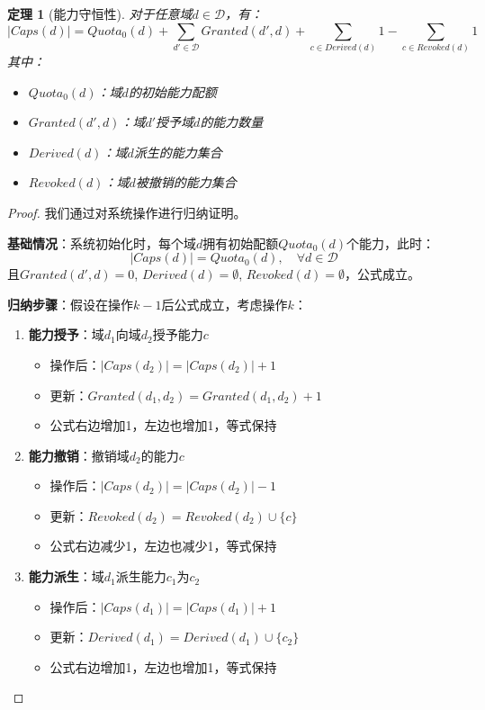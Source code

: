 \documentclass{article}
\newtheorem{theorem}{定理}[section]
\theoremstyle{definition}
\theoremstyle{remark}
\begin{document}
\begin{theorem}[能力守恒性]
    对于任意域$d \in \mathcal{D}$，有：
    \[
    |Caps(d)| = Quota_0(d) + \sum_{d' \in \mathcal{D}} Granted(d', d) + \sum_{c \in Derived(d)} 1 - \sum_{c \in Revoked(d)} 1
    \]
    其中：
    \begin{itemize}
        \item $Quota_0(d)$：域$d$的初始能力配额
        \item $Granted(d', d)$：域$d'$授予域$d$的能力数量
        \item $Derived(d)$：域$d$派生的能力集合
        \item $Revoked(d)$：域$d$被撤销的能力集合
    \end{itemize}
\end{theorem}

\begin{proof}
    我们通过对系统操作进行归纳证明。

    \textbf{基础情况}：系统初始化时，每个域$d$拥有初始配额$Quota_0(d)$个能力，此时：
    \[
    |Caps(d)| = Quota_0(d), \quad \forall d \in \mathcal{D}
    \]
    且$Granted(d', d) = 0$, $Derived(d) = \emptyset$, $Revoked(d) = \emptyset$，公式成立。

    \textbf{归纳步骤}：假设在操作$k-1$后公式成立，考虑操作$k$：

    \begin{enumerate}
        \item \textbf{能力授予}：域$d_1$向域$d_2$授予能力$c$
        \begin{itemize}
            \item 操作后：$|Caps(d_2)| = |Caps(d_2)| + 1$
            \item 更新：$Granted(d_1, d_2) = Granted(d_1, d_2) + 1$
            \item 公式右边增加1，左边也增加1，等式保持
        \end{itemize}

        \item \textbf{能力撤销}：撤销域$d_2$的能力$c$
        \begin{itemize}
            \item 操作后：$|Caps(d_2)| = |Caps(d_2)| - 1$
            \item 更新：$Revoked(d_2) = Revoked(d_2) \cup \{c\}$
            \item 公式右边减少1，左边也减少1，等式保持
        \end{itemize}

        \item \textbf{能力派生}：域$d_1$派生能力$c_1$为$c_2$
        \begin{itemize}
            \item 操作后：$|Caps(d_1)| = |Caps(d_1)| + 1$
            \item 更新：$Derived(d_1) = Derived(d_1) \cup \{c_2\}$
            \item 公式右边增加1，左边也增加1，等式保持
        \end{itemize}
    \end{enumerate}


\end{proof}
\end{document}
